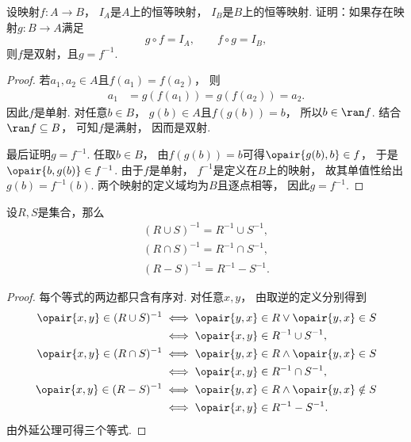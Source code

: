 \begin{example}\label{example:映射.可逆映射是双射}
    设映射\(f\colon A \to B\)，
    \(I_A\)是\(A\)上的恒等映射，
    \(I_B\)是\(B\)上的恒等映射.
    证明：如果存在映射\(g\colon B \to A\)满足
    \begin{equation*}
        g \circ f = I_A,
        \qquad
        f \circ g = I_B,
    \end{equation*}
    则\(f\)是双射，且\(g = f^{-1}\).
    \begin{proof}
        若\(a_1,a_2\in A\)且\(f(a_1)=f(a_2)\)，
        则
        \begin{align*}
            a_1 &=g(f(a_1))=g(f(a_2))=a_2.
        \end{align*}
        因此\(f\)是单射.
        对任意\(b\in B\)，
        \(g(b)\in A\)且\(f(g(b))=b\)，
        所以\(b\in\ran f\).
        结合\(\ran f\subseteq B\)，
        可知\(f\)是满射，
        因而是双射.

        最后证明\(g=f^{-1}\).
        任取\(b\in B\)，
        由\(f(g(b))=b\)可得\(\opair{g(b),b}\in f\)，
        于是\(\opair{b,g(b)}\in f^{-1}\).
        由于\(f\)是单射，
        \(f^{-1}\)是定义在\(B\)上的映射，
        故其单值性给出\(g(b)=f^{-1}(b)\).
        两个映射的定义域均为\(B\)且逐点相等，
        因此\(g=f^{-1}\).
    \end{proof}
\end{example}

\begin{theorem}
    设\(R,S\)是集合，那么
    \begin{gather}
        (R \cup S)^{-1} = R^{-1} \cup S^{-1},
        \label{equation:集合论.并的逆等于逆的并} \\
        (R \cap S)^{-1} = R^{-1} \cap S^{-1},
        \label{equation:集合论.交的逆等于逆的交} \\
        (R - S)^{-1} = R^{-1} - S^{-1}.
        \label{equation:集合论.差的逆等于逆的差}
    \end{gather}
    \begin{proof}
        每个等式的两边都只含有序对.
        对任意\(x,y\)，
        由取逆的定义分别得到
        \begin{align*}
            \opair{x,y}\in(R\cup S)^{-1}
            &\iff\opair{y,x}\in R\lor\opair{y,x}\in S \\
            &\iff\opair{x,y}\in R^{-1}\cup S^{-1}, \\
            \opair{x,y}\in(R\cap S)^{-1}
            &\iff\opair{y,x}\in R\land\opair{y,x}\in S \\
            &\iff\opair{x,y}\in R^{-1}\cap S^{-1}, \\
            \opair{x,y}\in(R-S)^{-1}
            &\iff\opair{y,x}\in R\land\opair{y,x}\notin S \\
            &\iff\opair{x,y}\in R^{-1}-S^{-1}.
        \end{align*}
        由外延公理可得三个等式.
    \end{proof}
\end{theorem}

